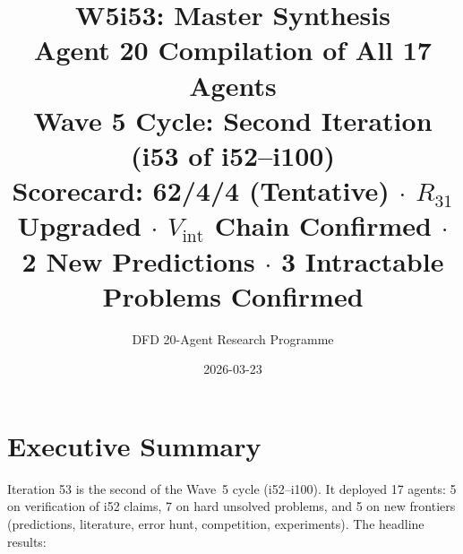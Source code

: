 \documentclass[11pt,a4paper]{article}
\title{\Huge W5i53: Master Synthesis\\[12pt]
\Large Agent 20 Compilation of All 17 Agents\\[6pt]
\large Wave 5 Cycle: Second Iteration (i53 of i52--i100)\\[6pt]
\normalsize Scorecard: 62/4/4 (Tentative) $\cdot$ $R_{31}$ Upgraded $\cdot$ $V_{\mathrm{int}}$ Chain Confirmed $\cdot$ 2 New Predictions $\cdot$ 3 Intractable Problems Confirmed}
\author{DFD 20-Agent Research Programme}
\date{2026-03-23}
\begin{document}
\maketitle


\section{Executive Summary}

Iteration 53 is the second of the Wave~5 cycle (i52--i100). It deployed 17 agents: 5 on verification of i52 claims, 7 on hard unsolved problems, and 5 on new frontiers (predictions, literature, error hunt, competition, experiments). The headline results:
\end{document}
